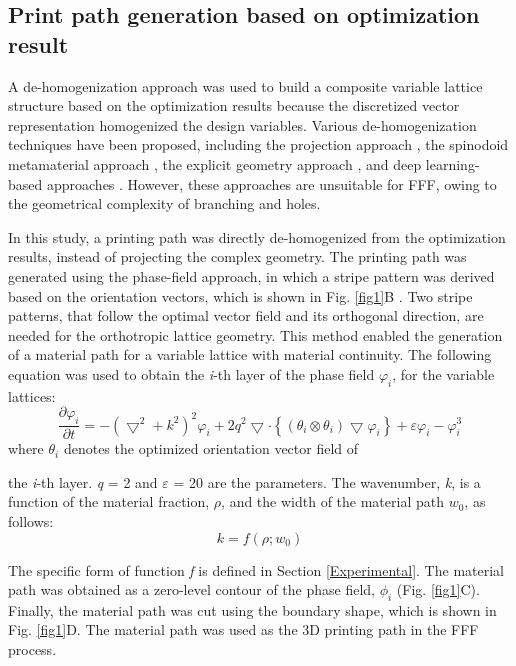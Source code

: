 \documentclass[a4paper,7pt,fleqn]{article}   %
\begin{document}
\begin{multicols}{2}
		\section{Print path generation based on optimization result}
		\label{Print path generation based on optimization result}
		A de-homogenization approach was used to build a composite variable
		lattice structure based on the optimization results because the
		discretized vector representation homogenized the design variables.
		Various de-homogenization techniques have been proposed, including
		the projection approach \cite{r24}, the spinodoid metamaterial approach \cite{r25,r26}
		, the explicit geometry approach \cite{r14}, and deep learning-based approaches
		\cite{r27}. However, these approaches are unsuitable for FFF, owing
		to the geometrical complexity of branching and holes.\par    %
		In this study, a printing path was directly de-homogenized from the
		optimization results, instead of projecting the complex geometry. The
		printing path was generated using the phase-field approach, in which a
		stripe pattern was derived based on the orientation vectors, which is
		shown in Fig. \ref{fig1}B \cite{r21}. Two stripe patterns, that follow the optimal
		vector field and its orthogonal direction, are needed for the orthotropic
		lattice geometry. This method enabled the generation of a material path
		for a variable lattice with material continuity. The following equation
		was used to obtain the \emph{i}-th layer of the phase field $\varphi_{i}$, for the variable lattices:
		\begin{equation}
			\frac{\partial \varphi _{i} }{\partial t} =-(\bigtriangledown ^{2}+k^{2})^{2}\varphi _{i}+
			2q^{2}\bigtriangledown \cdot \left \{ (\theta _{i}\otimes \theta _{i})\bigtriangledown \varphi _{i} \right \}
			+\varepsilon \varphi _{i}-\varphi_{i}^{3} 
			\label{eq11}
		\end{equation}
		where $\theta_{i}$ denotes the optimized orientation vector field of 
		
		the \emph{i}-th layer. \emph{q} = 2 and $\varepsilon$ = 20 are the parameters. The wavenumber, \emph{k}, is a function of the material fraction, $\rho$, and the width of the material path $w_{0}$, as follows:
		\begin{equation}
			k=f(\rho ;w_{0})
			\label{eq12}
		\end{equation}   \par     %
		The specific form of function \emph{f} is defined in Section \ref{Experimental}. The material
		path was obtained as a zero-level contour of the phase field, $\phi_{i}$ (Fig. \ref{fig1}C).
		Finally, the material path was cut using the boundary shape, which is
		shown in Fig. \ref{fig1}D. The material path was used as the 3D printing path in the FFF process.
		

\end{multicols}
\end{document}
